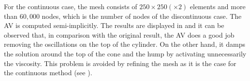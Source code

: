 For the continuous case, the mesh consists of $250\times 250 (\times 2)$ elements and more than $60,000$ nodes, which is the number of nodes of the discontinuous case. The AV is computed semi-implicitly. The results are displayed in  and it can be observed that, in comparison with the original result, the AV does a good job removing the oscillations on the top of the cylinder. On the other hand, it damps the solution around the top of the cone and the hump by activating unnecessarily the viscosity. This problem is avoided by refining the mesh as it is the case for the continuous method (see ). 

\begin{figure}%
\centering
{}%
%

\end{figure}
